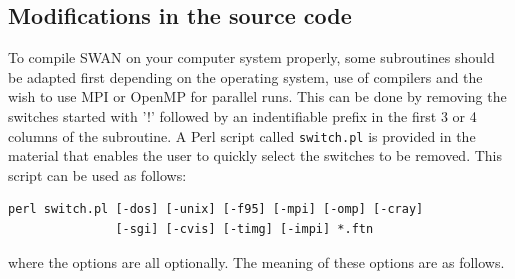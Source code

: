 \documentclass[12pt]{book}
\begin{document}
\subsection{Modifications in the source code}

To compile SWAN on your computer system properly, some subroutines should be adapted first
depending on the operating system, use of compilers and the wish to use MPI or OpenMP for
parallel runs. This can be done by removing the switches started with '!' followed by an
indentifiable prefix in the first 3 or 4 columns of the subroutine. A Perl script called
{\tt switch.pl} is provided in the material that enables the user to quickly select the
switches to be removed. This script can be used as follows:
\begin{verbatim}
perl switch.pl [-dos] [-unix] [-f95] [-mpi] [-omp] [-cray]
               [-sgi] [-cvis] [-timg] [-impi] *.ftn
\end{verbatim}
where the options are all optionally. The meaning of these options are as follows.
\end{document}
